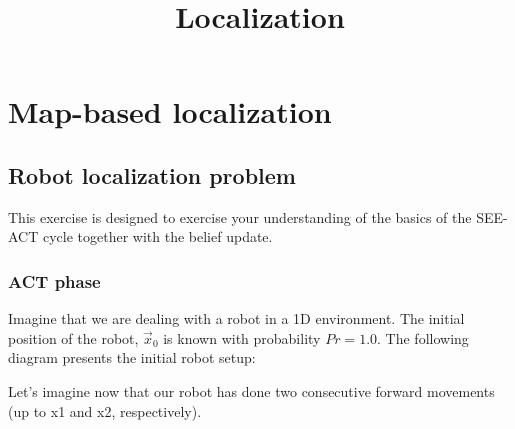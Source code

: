 \documentclass[12pt]{article}
\begin{document}
 
 
\title{Localization }
\date{\vspace{-20mm}}
\maketitle

\section*{Map-based localization} 

\subsection*{Robot localization problem}

This exercise is designed to exercise your understanding of the basics of the SEE-ACT cycle together with the belief update.

\subsubsection{ACT phase}

Imagine that we are dealing with a robot in a 1D environment. The initial position of the robot, $\vec{x}_0$ is known with probability $Pr=1.0$. The following diagram presents the initial robot setup: \\

\begin{figure}[h]
\noindent{}
\end{figure}

Let's imagine now that our robot has done two consecutive forward movements (up to x1 and x2, respectively). \\

\begin{figure}[h]
\noindent{}
\end{figure}
\end{document}
